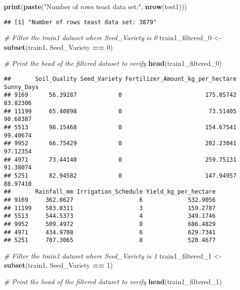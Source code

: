 \documentclass[
]{article}
\newenvironment{Shaded}{\begin{snugshade}}{\end{snugshade}}
\newcommand{\CommentTok}[1]{\textcolor[rgb]{0.56,0.35,0.01}{\textit{#1}}}
\newcommand{\DecValTok}[1]{\textcolor[rgb]{0.00,0.00,0.81}{#1}}
\newcommand{\FunctionTok}[1]{\textcolor[rgb]{0.13,0.29,0.53}{\textbf{#1}}}
\newcommand{\NormalTok}[1]{#1}
\newcommand{\OtherTok}[1]{\textcolor[rgb]{0.56,0.35,0.01}{#1}}
\newcommand{\SpecialCharTok}[1]{\textcolor[rgb]{0.81,0.36,0.00}{\textbf{#1}}}
\newcommand{\StringTok}[1]{\textcolor[rgb]{0.31,0.60,0.02}{#1}}
\begin{document}
\begin{Shaded}
\begin{Highlighting}[]
\FunctionTok{print}\NormalTok{(}\FunctionTok{paste}\NormalTok{(}\StringTok{"Number of rows teast data set:"}\NormalTok{, }\FunctionTok{nrow}\NormalTok{(test1)))}
\end{Highlighting}
\end{Shaded}

\begin{verbatim}
## [1] "Number of rows teast data set: 3879"
\end{verbatim}

\begin{Shaded}
\begin{Highlighting}[]
\CommentTok{\# Filter the train1 dataset where Seed\_Variety is 0}
\NormalTok{train1\_filtered\_0 }\OtherTok{\textless{}{-}} \FunctionTok{subset}\NormalTok{(train1, Seed\_Variety }\SpecialCharTok{==} \DecValTok{0}\NormalTok{)}

\CommentTok{\# Print the head of the filtered dataset to verify}
\FunctionTok{head}\NormalTok{(train1\_filtered\_0)}
\end{Highlighting}
\end{Shaded}

\begin{verbatim}
##       Soil_Quality Seed_Variety Fertilizer_Amount_kg_per_hectare Sunny_Days
## 9169      56.39287            0                        175.85742   83.82306
## 11199     65.40898            0                         73.51405   90.68387
## 5513      98.15468            0                        154.67541   99.40674
## 9952      66.75429            0                        202.23041   97.12354
## 4971      73.44140            0                        259.75131   91.38074
## 5251      82.94582            0                        147.94957   88.97410
##       Rainfall_mm Irrigation_Schedule Yield_kg_per_hectare
## 9169     362.0627                   6             532.9056
## 11199    583.0311                   3             159.2787
## 5513     544.5373                   4             349.1746
## 9952     509.4972                   8             686.4829
## 4971     434.9708                   6             629.7341
## 5251     707.3065                   8             520.4677
\end{verbatim}

\begin{Shaded}
\begin{Highlighting}[]
\CommentTok{\# Filter the train1 dataset where Seed\_Variety is 1}
\NormalTok{train1\_filtered\_1 }\OtherTok{\textless{}{-}} \FunctionTok{subset}\NormalTok{(train1, Seed\_Variety }\SpecialCharTok{==} \DecValTok{1}\NormalTok{)}

\CommentTok{\# Print the head of the filtered dataset to verify}
\FunctionTok{head}\NormalTok{(train1\_filtered\_1)}
\end{Highlighting}
\end{Shaded}
\end{document}
